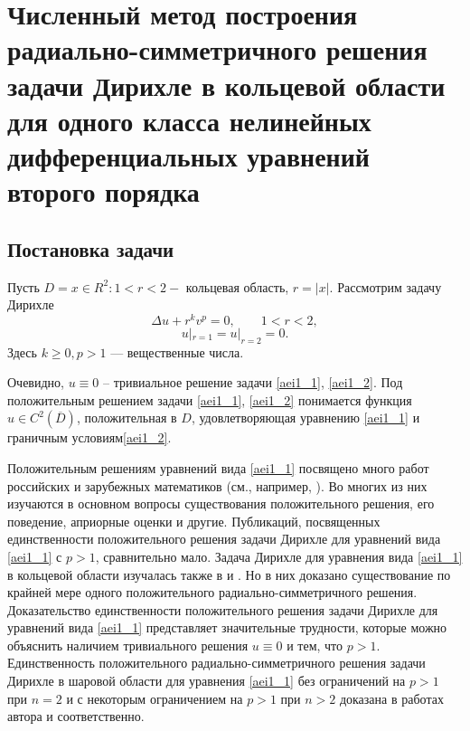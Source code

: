 


\chapter{ Численный метод построения  радиально-симметричного
 решения задачи Дирихле  в кольцевой области для  одного класса нелинейных
  дифференциальных уравнений  второго порядка}
















\section{Постановка задачи}

           Пусть $ D={x\in R^2: 1<r<2}-$  кольцевая область,
$ r=|x| $.    Рассмотрим задачу Дирихле
\begin{equation}\label{aei1_1}
\Delta u+r^kv^p=0, \qquad 1<r<2,
\end{equation}
\begin{equation}\label{aei1_2}
u|_{r=1}=u|_{r=2}=0.
\end{equation}
Здесь $ k \geq 0, p>1$ --- вещественные числа.

Очевидно, $ u \equiv 0$ -- тривиальное решение задачи \eqref{aei1_1}, \eqref{aei1_2}. Под
положительным решением задачи \eqref{aei1_1}, \eqref{aei1_2} понимается функция $ u \in
C^2(\overline {D})$, положительная в $D$, удовлетворяющая
уравнению \eqref{aei1_1} и граничным условиям\eqref{aei1_2}.

Положительным решениям уравнений вида \eqref{aei1_1} посвящено много
работ российских и зарубежных математиков
(см., например, \cite{aeiL_1, aeiL_2, aeiL_3, aeiL_4, aeiL_5, aeiL_6, aeiL_7, aeiL_8, aeiL_9, aeiL_10, aeiL_11, aeiL_12}). 
Во многих из них изучаются в основном
вопросы существования положительного решения, его поведение,
априорные оценки и другие. Публикаций, посвященных
единственности положительного решения задачи Дирихле
для уравнений вида \eqref{aei1_1} с $ p>1$, сравнительно мало.
Задача Дирихле для уравнения вида \eqref{aei1_1} в кольцевой области
изучалась также в \cite{aeiL_1} и \cite{aeiL_11}. Но в них доказано существование
по крайней мере одного положительного радиально-симметричного
решения. Доказательство единственности положительного решения
 задачи Дирихле для уравнений вида \eqref{aei1_1} представляет
значительные трудности, которые можно объяснить наличием
тривиального решения $ u \equiv 0 $  и тем, что $ p>1 $.
Единственность положительного радиально-симметричного решения
задачи Дирихле в шаровой области для  уравнения \eqref{aei1_1}  без
ограничений на $ p>1 $ при $ n=2 $  и с некоторым
ограничением на $ p>1 $  при $ n>2 $  доказана в работах
автора \cite{aeiL_12} и  \cite{aeiL_13} соответственно.

